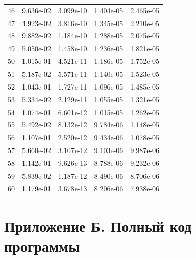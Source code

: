 \documentclass[12pt,a4paper]{article}
\begin{document}
\begin{longtable}{rrrrr}
46 & 9.636e-02 & 3.099e-10 & 1.404e-05 & 2.465e-05\\
47 & 4.923e-02 & 3.816e-10 & 1.345e-05 & 2.210e-05\\
48 & 9.882e-02 & 1.184e-10 & 1.288e-05 & 2.075e-05\\
49 & 5.050e-02 & 1.458e-10 & 1.236e-05 & 1.821e-05\\
50 & 1.015e-01 & 4.521e-11 & 1.186e-05 & 1.752e-05\\
51 & 5.187e-02 & 5.571e-11 & 1.140e-05 & 1.523e-05\\
52 & 1.043e-01 & 1.727e-11 & 1.096e-05 & 1.485e-05\\
53 & 5.334e-02 & 2.129e-11 & 1.055e-05 & 1.321e-05\\
54 & 1.074e-01 & 6.601e-12 & 1.015e-05 & 1.262e-05\\
55 & 5.492e-02 & 8.132e-12 & 9.784e-06 & 1.148e-05\\
56 & 1.107e-01 & 2.520e-12 & 9.434e-06 & 1.078e-05\\
57 & 5.660e-02 & 3.107e-12 & 9.103e-06 & 9.987e-06\\
58 & 1.142e-01 & 9.626e-13 & 8.788e-06 & 9.232e-06\\
59 & 5.839e-02 & 1.187e-12 & 8.490e-06 & 8.706e-06\\
60 & 1.179e-01 & 3.678e-13 & 8.206e-06 & 7.938e-06\\
\bottomrule\end{longtable}\endgroup
\clearpage
\section*{Приложение Б. Полный код программы}
\end{document}
